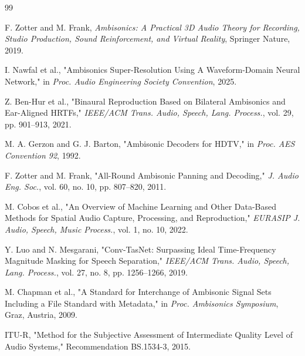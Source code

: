 \documentclass[10pt,twocolumn]{article}
\begin{document}
\begin{thebibliography}{99}

F. Zotter and M. Frank, \textit{Ambisonics: A Practical 3D Audio Theory for Recording, Studio Production, Sound Reinforcement, and Virtual Reality}, Springer Nature, 2019.

I. Nawfal et al., "Ambisonics Super-Resolution Using A Waveform-Domain Neural Network," in \textit{Proc. Audio Engineering Society Convention}, 2025.

Z. Ben-Hur et al., "Binaural Reproduction Based on Bilateral Ambisonics and Ear-Aligned HRTFs," \textit{IEEE/ACM Trans. Audio, Speech, Lang. Process.}, vol. 29, pp. 901--913, 2021.

M. A. Gerzon and G. J. Barton, "Ambisonic Decoders for HDTV," in \textit{Proc. AES Convention 92}, 1992.

F. Zotter and M. Frank, "All-Round Ambisonic Panning and Decoding," \textit{J. Audio Eng. Soc.}, vol. 60, no. 10, pp. 807--820, 2011.

M. Cobos et al., "An Overview of Machine Learning and Other Data-Based Methods for Spatial Audio Capture, Processing, and Reproduction," \textit{EURASIP J. Audio, Speech, Music Process.}, vol. 1, no. 10, 2022.

Y. Luo and N. Mesgarani, "Conv-TasNet: Surpassing Ideal Time-Frequency Magnitude Masking for Speech Separation," \textit{IEEE/ACM Trans. Audio, Speech, Lang. Process.}, vol. 27, no. 8, pp. 1256--1266, 2019.

M. Chapman et al., "A Standard for Interchange of Ambisonic Signal Sets Including a File Standard with Metadata," in \textit{Proc. Ambisonics Symposium}, Graz, Austria, 2009.

ITU-R, "Method for the Subjective Assessment of Intermediate Quality Level of Audio Systems," Recommendation BS.1534-3, 2015.

\end{thebibliography}
\end{document}
